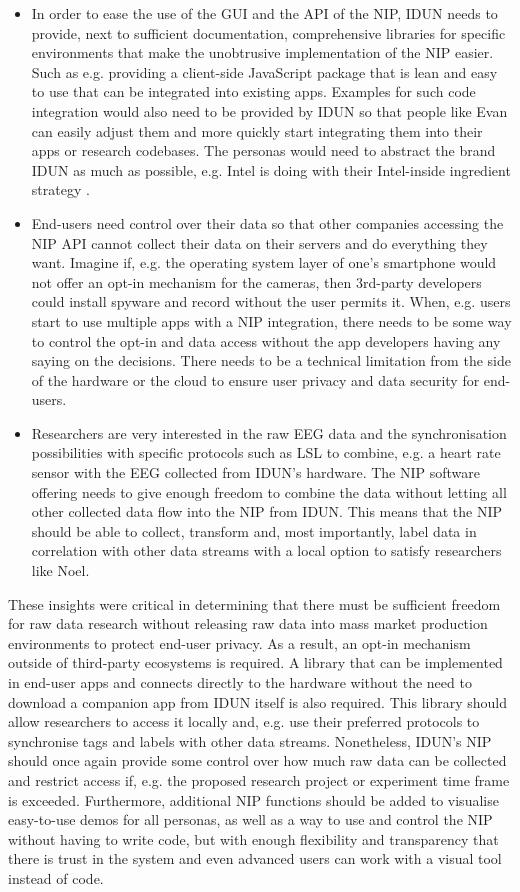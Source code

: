 \begin{itemize}
  \item In order to ease the use of the GUI and the API of the NIP, IDUN needs to provide, next to sufficient documentation, comprehensive libraries for specific environments that make the unobtrusive implementation of the NIP easier. Such as e.g. providing a client-side JavaScript package that is lean and easy to use that can be integrated into existing apps. Examples for such code integration would also need to be provided by IDUN so that people like Evan can easily adjust them and more quickly start integrating them into their apps or research codebases. The personas would need to abstract the brand IDUN as much as possible, e.g. Intel is doing with their Intel-inside ingredient strategy \citep{intel_ingredient_nodate}.
  \item End-users need control over their data so that other companies accessing the NIP API cannot collect their data on their servers and do everything they want. Imagine if, e.g. the operating system layer of one's smartphone would not offer an opt-in mechanism for the cameras, then 3rd-party developers could install spyware and record without the user permits it. When, e.g. users start to use multiple apps with a NIP integration, there needs to be some way to control the opt-in and data access without the app developers having any saying on the decisions. There needs to be a technical limitation from the side of the hardware or the cloud to ensure user privacy and data security for end-users.
  \item Researchers are very interested in the raw EEG data and the synchronisation possibilities with specific protocols such as LSL to combine, e.g. a heart rate sensor with the EEG collected from IDUN's hardware. The NIP software offering needs to give enough freedom to combine the data without letting all other collected data flow into the NIP from IDUN. This means that the NIP should be able to collect, transform and, most importantly, label data in correlation with other data streams with a local option to satisfy researchers like Noel.
\end{itemize}

These insights were critical in determining that there must be sufficient freedom for raw data research without releasing raw data into mass market production environments to protect end-user privacy. As a result, an opt-in mechanism outside of third-party ecosystems is required. A library that can be implemented in end-user apps and connects directly to the hardware without the need to download a companion app from IDUN itself is also required. This library should allow researchers to access it locally and, e.g. use their preferred protocols to synchronise tags and labels with other data streams. Nonetheless, IDUN's NIP should once again provide some control over how much raw data can be collected and restrict access if, e.g. the proposed research project or experiment time frame is exceeded. Furthermore, additional NIP functions should be added to visualise easy-to-use demos for all personas, as well as a way to use and control the NIP without having to write code, but with enough flexibility and transparency that there is trust in the system and even advanced users can work with a visual tool instead of code.

